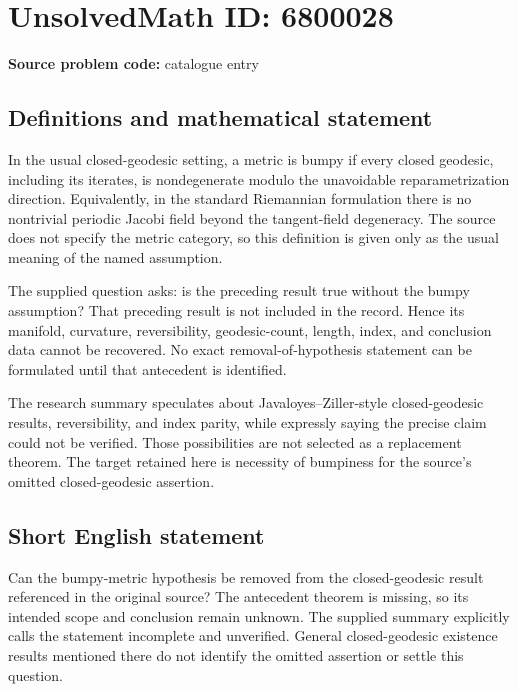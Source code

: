 \documentclass[11pt]{article}
\begin{document}
\section*{UnsolvedMath ID: 6800028}
\textbf{Source problem code:} catalogue entry
\subsection{Definitions and mathematical statement}
In the usual closed-geodesic setting, a metric is bumpy if every closed geodesic, including its iterates, is nondegenerate modulo the unavoidable reparametrization direction. Equivalently, in the standard Riemannian formulation there is no nontrivial periodic Jacobi field beyond the tangent-field degeneracy. The source does not specify the metric category, so this definition is given only as the usual meaning of the named assumption.

The supplied question asks: is the preceding result true without the bumpy assumption? That preceding result is not included in the record. Hence its manifold, curvature, reversibility, geodesic-count, length, index, and conclusion data cannot be recovered. No exact removal-of-hypothesis statement can be formulated until that antecedent is identified.

The research summary speculates about Javaloyes--Ziller-style closed-geodesic results, reversibility, and index parity, while expressly saying the precise claim could not be verified. Those possibilities are not selected as a replacement theorem. The target retained here is necessity of bumpiness for the source's omitted closed-geodesic assertion.
\subsection{Short English statement}
Can the bumpy-metric hypothesis be removed from the closed-geodesic result referenced in the original source? The antecedent theorem is missing, so its intended scope and conclusion remain unknown. The supplied summary explicitly calls the statement incomplete and unverified. General closed-geodesic existence results mentioned there do not identify the omitted assertion or settle this question.
\end{document}
